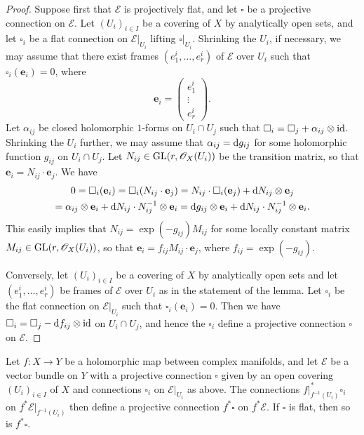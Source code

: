 \documentclass[english,10pt]{amsart}
\newcommand{\sE}{\mathscr{E}}
\newcommand{\sO}{\mathscr{O}}
\newcommand{\dd}{\textup{d}}
\theoremstyle{definition}
\theoremstyle{remark}
\numberwithin{equation}{section}
\begin{document}
\begin{proof}
Suppose first that $\sE$ is projectively flat, and let $\square$ be a projective connection on $\sE$.
Let $(U_i)_{i \in I}$ be a covering of $X$ by analytically open sets, and let $\square_i$ be a flat connection on $\sE|_{U_i}$ lifting $\square|_{U_i}$. Shrinking the $U_i$, if necessary, we may assume that there exist frames
$(e_1^i,\ldots,e_r^i)$ of $\sE$ over $U_i$ such that $\square_i(\textbf{e}_i)=0$, where 
\[
\textbf{e}_i = 
\begin{pmatrix}
e_1^i \\
\vdots \\
e_r^i
\end{pmatrix}
.
\]
Let $\alpha_{ij}$ be closed holomorphic $1$-forms on $U_i\cap U_j$ such that $\square_i=\square_j+\alpha_{ij}\otimes \textup{id}$. Shrinking the $U_i$ further, we may assume that $\alpha_{ij}=\dd g_{ij}$ for some holomorphic function $g_{ij}$ on $U_i\cap U_j$. Let $N_{ij}\in \textup{GL}(r,\sO_X(U_i))$ be the transition matrix, so that $\textbf{e}_i=N_{ij} \cdot \textbf{e}_j$. We have
\begin{multline*}
0 = \square_i (\textbf{e}_i) = \square_i (N_{ij} \cdot \textbf{e}_j) = N_{ij} \cdot \square_i(\textbf{e}_j) + \dd N_{ij} \otimes \textbf{e}_j \\ = \alpha_{ij} \otimes \textbf{e}_i + \dd N_{ij}\cdot N_{ij}^{-1} \otimes \textbf{e}_i = \dd g_{ij} \otimes \textbf{e}_i + \dd N_{ij}\cdot N_{ij}^{-1} \otimes \textbf{e}_i.
\end{multline*}
This easily implies that $N_{ij}=\exp(-g_{ij}) M_{ij}$ for some locally constant matrix $M_{ij} \in \textup{GL}(r,\sO_X(U_i))$, so that $\textbf{e}_i= f_{ij} M_{ij} \cdot \textbf{e}_j$, where $f_{ij}=\exp(-g_{ij})$. 

Conversely, let $(U_i)_{i \in I}$ be a covering of $X$ by analytically open sets and let $(e_1^i,\ldots,e_r^i)$ be frames of $\sE$ over $U_i$ as in the statement of the lemma. Let $\square_i$ be the flat connection on $\sE|_{U_i}$ such that $\square_i (\textbf{e}_i)=0$. Then we have $\square_i=\square_j-\dd f_{ij}\otimes \textup{id}$ on $U_i \cap U_j$, and hence the $\square_i$ define a projective connection $\square$ on $\sE$.
\end{proof}

Let $f \colon X \to Y$ be a holomorphic map between complex manifolds, and let $\sE$ be a vector bundle on $Y$ with a projective connection $\square$ given by an open covering $(U_i)_{i\in I}$ of $X$ and connections $\square_i$ on $\sE|_{U_i}$ as above. The connections
$f|_{f^{-1}(U_i)}^*\square_i$ on $f^*\sE|_{f^{-1}(U_i)}$ then define a projective connection $f^*\square$ on $f^*\sE$. If $\square$ is flat, then so is $f^*\square$.
\end{document}
